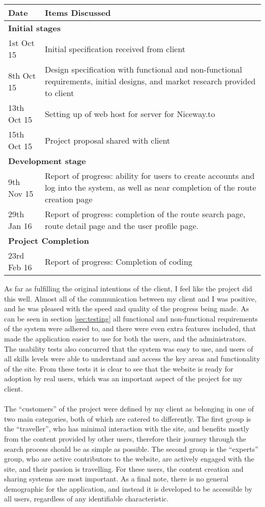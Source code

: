 \begin{center}
\begin{tabular}{p{2cm}|p{12cm}}
	\hline
	\textbf{Date} & \textbf{Items Discussed}\\
	\hline	
	\multicolumn{2}{l}{\textbf{Initial stages}}\\
	\hline
	1st Oct 15 & Initial specification received from client\\
	8th Oct 15 & Design specification with functional and non-functional requirements, initial designs, and market research provided to client\\	
	13th Oct 15 & Setting up of web host for server for Niceway.to \\
	15th Oct 15 & Project proposal shared with client \\
	\hline
	\multicolumn{2}{l}{\textbf{Development stage}}\\
	\hline
	9th Nov 15 & Report of progress: ability for users to create accounts and log into the system, as well as near completion of the route creation page \\
	29th Jan 16 & Report of progress: completion of the route search page, route detail page and the user profile page.\\
	\hline
	\multicolumn{2}{l}{\textbf{Project Completion}}\\	
	\hline		
	23rd Feb 16 & Report of progress: Completion of coding\\
	\hline	
	\end{tabular}	
\end{center}
\noindent 
As far as fulfilling the original intentions of the client, I feel like the project did this well. Almost all of the communication between my client and I was positive, and he was pleased with the speed and quality of the progress being made. As can be seen in section \ref{sec:testing} all functional and non-functional requirements of the system were adhered to, and there were even extra features included, that made the application easier to use for both the users, and the administrators. The usability tests also concurred that the system was easy to use, and users of all skills levels were able to understand and access the key areas and functionality of the site. From these tests it is clear to see that the website is ready for adoption by real users, which was an important aspect of the project for my client.\ \\
\ \\
The ``customers'' of the project were defined by my client as belonging in one of two main categories, both of which are catered to differently. The first group is the ``traveller'', who has minimal interaction with the site, and benefits mostly from the content provided by other users, therefore their journey through the search process should be as simple as possible. The second group is the ``experts'' group, who are active contributors to the website, are actively engaged with the site, and their passion is travelling. For these users, the content creation and sharing systems are most important. As a final note, there is no general demographic for the application, and instead it is developed to be accessible by all users, regardless of any identifiable characteristic.